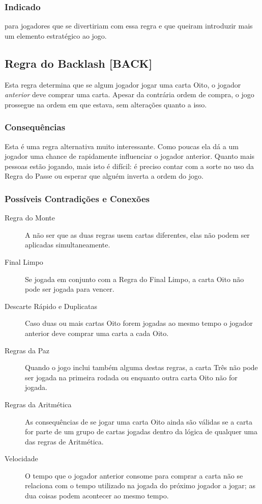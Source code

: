 \subsubsection{Indicado}

para jogadores que se divertiriam com essa regra e que queiram introduzir mais um elemento estratégico ao jogo.

\subsection{Regra do Backlash [BACK]}

Esta regra determina que se algum jogador jogar uma carta Oito, o jogador \emph{anterior} deve comprar uma carta. Apesar da contrária ordem de compra, o jogo prossegue na ordem em que estava, sem alterações quanto a isso.

\subsubsection{Consequências}

Esta é uma regra alternativa muito interessante. Como poucas ela dá a um jogador uma chance de rapidamente influenciar o jogador anterior. Quanto mais pessoas estão jogando, mais isto é difícil: é preciso contar com a sorte no uso da Regra do Passe ou esperar que alguém inverta a ordem do jogo.

\subsubsection{Possíveis Contradições e Conexões}

\begin{description}
\item[Regra do Monte]{A não ser que as duas regras usem cartas diferentes, elas não podem ser aplicadas simultaneamente.}
\item[Final Limpo]{Se jogada em conjunto com a Regra do Final Limpo, a carta Oito não pode ser jogada para vencer.}
\item[Descarte Rápido e Duplicatas]{Caso duas ou mais cartas Oito forem jogadas ao mesmo tempo o jogador anterior deve comprar uma carta a cada Oito.}
\item[Regras da Paz]{Quando o jogo inclui também alguma destas regras, a carta Três não pode ser jogada na primeira rodada ou enquanto outra carta Oito não for jogada.}
\item[Regras da Aritmética]{As consequências de se jogar uma carta Oito ainda são válidas se a carta for parte de um grupo de cartas jogadas dentro da lógica de qualquer uma das regras de Aritmética.}
\item[Velocidade]{O tempo que o jogador anterior consome para comprar a carta não se relaciona com o tempo utilizado na jogada do próximo jogador a jogar; as dua coisas podem acontecer ao mesmo tempo.}
\end{description}


